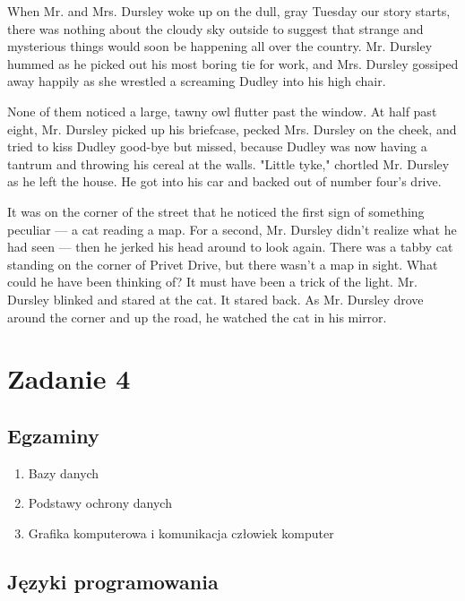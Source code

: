 \documentclass{article}
\begin{document}
\vspace{0,5cm}
When Mr. and Mrs. Dursley woke up on the dull, gray Tuesday our story
starts, there was nothing about the cloudy sky outside to suggest that
strange and mysterious things would soon be happening all over the
country. Mr. Dursley hummed as he picked out his most boring tie for
work, and Mrs. Dursley gossiped away happily as she wrestled a screaming
Dudley into his high chair.

\vspace{0,5cm}
None of them noticed a large, tawny owl flutter past the window.
At half past eight, Mr. Dursley picked up his briefcase, pecked Mrs.
Dursley on the cheek, and tried to kiss Dudley good-bye but missed,
because Dudley was now having a tantrum and throwing his cereal at the
walls. "Little tyke," chortled Mr. Dursley as he left the house. He got
into his car and backed out of number four's drive.

\vspace{0,5cm}
It was on the corner of the street that he noticed the first sign of
something peculiar — a cat reading a map. For a second, Mr. Dursley
didn't realize what he had seen — then he jerked his head around to
look again. There was a tabby cat standing on the corner of Privet
Drive, but there wasn't a map in sight. What could he have been thinking
of? It must have been a trick of the light. Mr. Dursley blinked and
stared at the cat. It stared back. As Mr. Dursley drove around the
corner and up the road, he watched the cat in his mirror.  \cite{harry}

\newpage
\section{Zadanie 4}
\vspace{0,3cm}
\subsection{Egzaminy}

\begin{enumerate}[\hspace{0,5cm}a)]
	\item Bazy danych
	\item Podstawy ochrony danych
	\item Grafika komputerowa i komunikacja człowiek komputer
\end{enumerate}

\vspace{0,3cm}
\subsection{Języki programowania}
\end{document}
